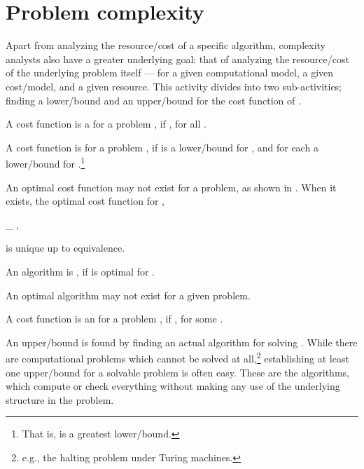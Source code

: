 \documentclass[b5paper, english, oneside]{memoir}
\begin{document}
\section{Problem complexity}

Apart from analyzing the resource\-/cost of a specific algorithm, complexity analysts also have a greater underlying goal: that of analyzing the resource\-/cost of the underlying problem  itself --- for a given computational model, a given cost\-/model, and a given resource. This activity divides into two sub-activities; finding a lower\-/bound and an upper\-/bound for the cost function of .

\begin{definition}
A cost function  is a  for a problem , if , for all . 
\end{definition}

\begin{definition}
A cost function  is  for a problem , if  is a lower\-/bound for , and  for each  a lower\-/bound for .\footnote{That is,  is a greatest lower\-/bound.} 
\end{definition}

\begin{note}
An optimal cost function may not exist for a problem, as shown in . When it exists, the optimal cost function for ,
\begin{eqs}
\inf_{\domi} ,
\end{eqs}
is unique up to equivalence. 
\end{note}

\begin{definition}
An algorithm  is , if  is optimal for .
\end{definition}

\begin{note}
An optimal algorithm may not exist for a given problem.
\end{note}

\begin{definition}
A cost function  is an  for a problem , if , for some . 
\end{definition}

An upper\-/bound is found by finding an actual algorithm for solving . While there are computational problems which cannot be solved at all,\footnote{e.g., the halting problem under Turing machines.} establishing at least one upper\-/bound for a solvable problem is often easy. These are the  algorithms, which compute or check everything without making any use of the underlying structure in the problem. 
\end{document}
